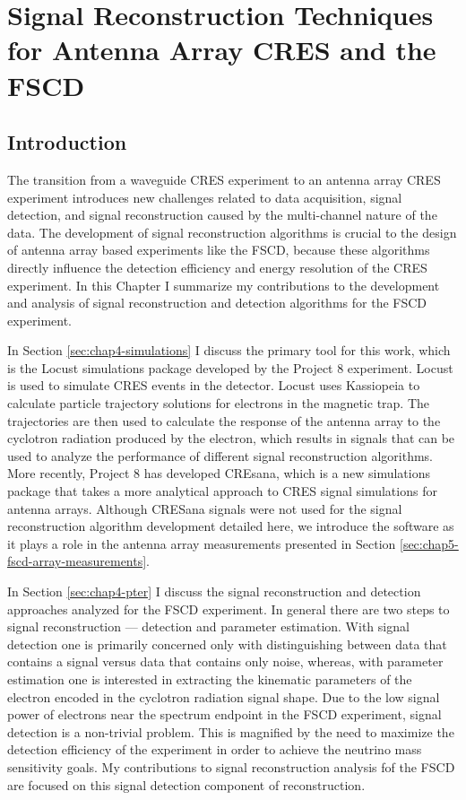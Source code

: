 \chapter{Signal Reconstruction Techniques for Antenna Array CRES and the FSCD}

\section{Introduction}

The transition from a waveguide CRES experiment to an antenna array CRES experiment introduces new challenges related to data acquisition, signal detection, and signal reconstruction caused by the multi-channel nature of the data. The development of signal reconstruction algorithms is crucial to the design of antenna array based experiments like the FSCD, because these algorithms directly influence the detection efficiency and energy resolution of the CRES experiment. In this Chapter I summarize my contributions to the development and analysis of signal reconstruction and detection algorithms for the FSCD experiment.

In Section \ref{sec:chap4-simulations} I discuss the primary tool for this work, which is the Locust simulations package developed by the Project 8 experiment. Locust is used to simulate CRES events in the detector. Locust uses Kassiopeia to calculate particle trajectory solutions for electrons in the magnetic trap. The trajectories are then used to calculate the response of the antenna array to the cyclotron radiation produced by the electron, which results in signals that can be used to analyze the performance of different signal reconstruction algorithms. More recently, Project 8 has developed CREsana, which is a new simulations package that takes a more analytical approach to CRES signal simulations for antenna arrays. Although CRESana signals were not used for the signal reconstruction algorithm development detailed here, we introduce the software as it plays a role in the antenna array measurements presented in Section \ref{sec:chap5-fscd-array-measurements}.

In Section \ref{sec:chap4-pter} I discuss the signal reconstruction and detection approaches analyzed for the FSCD experiment. In general there are two steps to signal reconstruction --- detection and parameter estimation. With signal detection one is primarily concerned only with distinguishing between data that contains a signal versus data that contains only noise, whereas, with parameter estimation one is interested in extracting the kinematic parameters of the electron encoded in the cyclotron radiation signal shape. Due to the low signal power of electrons near the spectrum endpoint in the FSCD experiment, signal detection is a non-trivial problem. This is magnified by the need to maximize the detection efficiency of the experiment in order to achieve the neutrino mass sensitivity goals. My contributions to signal reconstruction analysis fof the FSCD are focused on this signal detection component of reconstruction.


